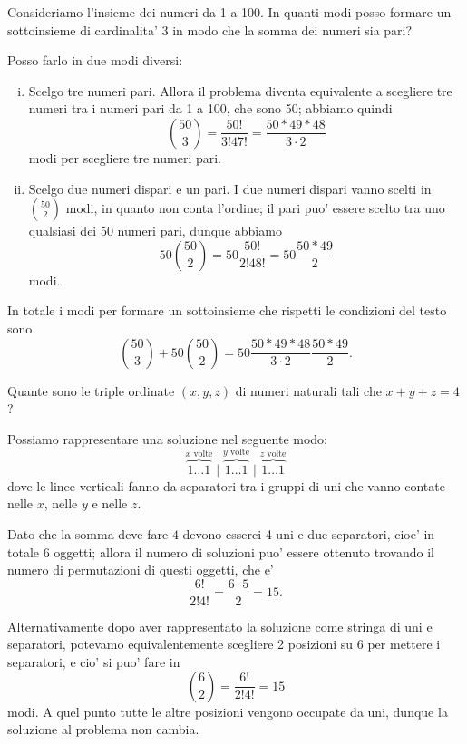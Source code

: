 \begin{example}
    Consideriamo l'insieme dei numeri da 1 a 100. In quanti modi posso formare un sottoinsieme di cardinalita' 3 in modo che la somma dei numeri sia pari?
\end{example}
\begin{solution}
    Posso farlo in due modi diversi:
    \begin{enumerate}[(i)]
        \item Scelgo tre numeri pari. Allora il problema diventa equivalente a scegliere tre numeri tra i numeri pari da 1 a 100, che sono 50; abbiamo quindi \[
            \binom{50}{3} = \frac{50!}{3!47!} = \frac{50 * 49 * 48}{3 \cdot 2}   
        \] modi per scegliere tre numeri pari.
        \item Scelgo due numeri dispari e un pari. I due numeri dispari vanno scelti in $\binom{50}{2}$ modi, in quanto non conta l'ordine; il pari puo' essere scelto tra uno qualsiasi dei 50 numeri pari, dunque abbiamo \[
            50\binom{50}{2} = 50\frac{50!}{2!48!} = 50\frac{50 * 49}{2}
        \] modi.
    \end{enumerate}
    In totale i modi per formare un sottoinsieme che rispetti le condizioni del testo sono \[
        \binom{50}{3} + 50\binom{50}{2} = 50\frac{50 * 49 * 48}{3 \cdot 2}\frac{50 * 49}{2}.           
    \]
\end{solution}

\begin{example}
    Quante sono le triple ordinate $(x, y , z)$ di numeri naturali tali che $x + y + z = 4$?
\end{example}
\begin{solution}
    Possiamo rappresentare una soluzione nel seguente modo:
    \[
        \overbrace{1 \dots 1}^{x \text{ volte}} \mid   \overbrace{1 \dots 1}^{y \text{ volte}} \mid\overbrace{1 \dots 1}^{z \text{ volte}}
    \] dove le linee verticali fanno da separatori tra i gruppi di uni che vanno contate nelle $x$, nelle $y$ e nelle $z$. 
    
    Dato che la somma deve fare $4$ devono esserci 4 uni e due separatori, cioe' in totale 6 oggetti; allora il numero di soluzioni puo' essere ottenuto trovando il numero di permutazioni di questi oggetti, che e' \[
        \frac{6!}{2!4!} = \frac{6 \cdot 5}{2} = 15.
    \]

    Alternativamente dopo aver rappresentato la soluzione come stringa di uni e separatori, potevamo equivalentemente scegliere 2 posizioni su 6 per mettere i separatori, e cio' si puo' fare in \[
        \binom{6}{2} = \frac{6!}{2!4!} = 15    
    \] modi. A quel punto tutte le altre posizioni vengono occupate da uni, dunque la soluzione al problema non cambia.
\end{solution}

